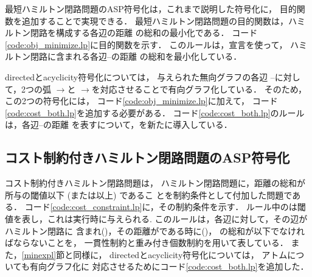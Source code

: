 

最短ハミルトン閉路問題のASP符号化は，これまで説明した符号化に，
目的関数を追加することで実現できる．
最短ハミルトン閉路問題の目的関数は，ハミルトン閉路を構成する各辺の距離
の総和の最小化である．
コード\ref{code:obj_minimize.lp}に目的関数を示す．
このルールは，宣言を使って，
ハミルトン閉路に含まれる各辺--の距離
の総和を最小化している．

\textsf{directed}と\textsf{acyclicity}符号化については，
与えられた無向グラフの各辺
--に対して，2つの弧
$\rightarrow$と
$\rightarrow$を対応させることで有向グラフ化している．
そのため，この2つの符号化には，
コード\ref{code:obj_minimize.lp}に加えて，
コード\ref{code:cost_both.lp}を追加する必要がある．
コード\ref{code:cost_both.lp}のルールは，各辺--の距離
を表すについて，を新たに導入している．

\subsection{コスト制約付きハミルトン閉路問題のASP符号化}



コスト制約付きハミルトン閉路問題は，
ハミルトン閉路問題に，距離の総和が所与の閾値以下 (または以上) であるこ
とを制約条件として付加した問題である．
コード\ref{code:cost_constraint.lp}に，その制約条件を示す．
ルール中のは閾値を表し，これは実行時に与えられる.
このルールは，各辺に対して，その辺がハミルトン閉路に
含まれ()，その距離がである時に()，
の総和が以下でなければならないことを，
一貫性制約と重み付き個数制約を用いて表している．
また，\ref{minexpl}節と同様に，
\textsf{directed}と\textsf{acyclicity}符号化については，
アトムについても有向グラフ化に
対応させるためにコード\ref{code:cost_both.lp}を追加した．

